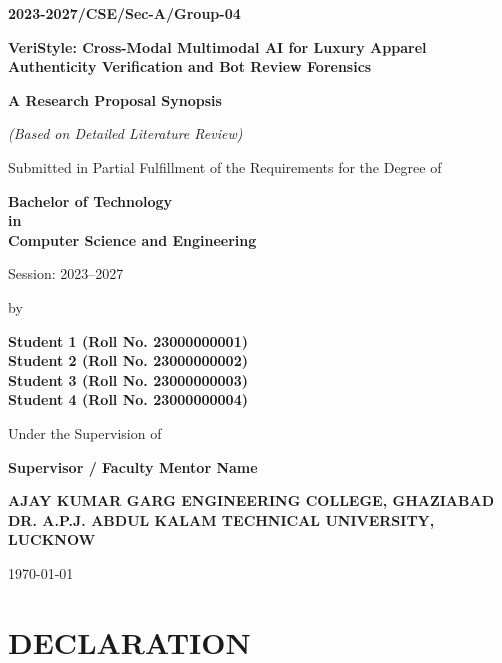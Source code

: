 \documentclass[a4paper,12pt]{report}
\newcommand{\reporttitle}{VeriStyle: Cross-Modal Multimodal AI for Luxury Apparel Authenticity Verification and Bot Review Forensics}
\newcommand{\session}{2023--2027}
\newcommand{\batchcode}{2023-2027/CSE/Sec-A/Group-04}
\newcommand{\degree}{Bachelor of Technology\\in\\Computer Science and Engineering}
\newcommand{\students}{Student 1 (Roll No. 23000000001)\\Student 2 (Roll No. 23000000002)\\Student 3 (Roll No. 23000000003)\\Student 4 (Roll No. 23000000004)}
\newcommand{\mentor}{Supervisor / Faculty Mentor Name}
\newcommand{\university}{AJAY KUMAR GARG ENGINEERING COLLEGE, GHAZIABAD\\DR. A.P.J. ABDUL KALAM TECHNICAL UNIVERSITY, LUCKNOW}
\newcommand{\submissiondate}{\today}
\begin{document}
\begin{titlepage}
\begin{flushright}
\textbf{\batchcode}
\end{flushright}

\begin{center}
\vspace*{0.5cm}
{\Large\textbf{\reporttitle}\par}
\vspace{1.2cm}
{\large\textbf{A Research Proposal Synopsis}\par}
{\large\textit{(Based on Detailed Literature Review)}\par}
\vspace{1.2cm}
Submitted in Partial Fulfillment of the Requirements for the Degree of\par
\vspace{0.4cm}
{\large\textbf{\degree}\par}
\vspace{0.8cm}
Session: \session\par
\vspace{0.8cm}
by\par
\vspace{0.4cm}
{\large\textbf{\students}\par}
\vspace{1.0cm}
Under the Supervision of\par
\vspace{0.4cm}
{\large\textbf{\mentor}\par}
\vspace{1.2cm}
{\large\textbf{\university}\par}
\vfill
{\large\submissiondate\par}
\vspace*{0.5cm}
\end{center}
\end{titlepage}

\onehalfspacing
{}
\newpage

\chapter*{DECLARATION}
\end{document}
